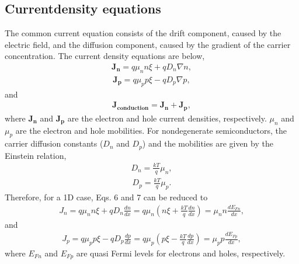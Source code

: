 \documentclass[a4paper,10pt,english]{sphinxmanual}
\begin{document}
\subsection{Current\sphinxhyphen{}density equations}
\label{\detokenize{Basic_equation:current-density-equations}}
\sphinxAtStartPar
The common current equation consists of the drift component, caused by the electric field, and the diffusion component, caused by the gradient of the carrier concentration.
The current density equations are below,
\begin{equation*}
\begin{split}\mathbf{J_n} = q\mu_nn\xi + qD_n\nabla n,\tag{6}\end{split}
\end{equation*}\begin{equation*}
\begin{split}\mathbf{J_p} = q\mu_pp\xi - qD_p\nabla p,\tag{7}\end{split}
\end{equation*}
\sphinxAtStartPar
and
\begin{equation*}
\begin{split}\mathbf{J_{conduction}} = \mathbf{J_n} + \mathbf{J_p},\tag{8}\end{split}
\end{equation*}
\sphinxAtStartPar
where \(\mathbf{J_n}\) and \(\mathbf{J_p}\) are the electron and hole current densities, respectively.
\(\mu_n\) and \(\mu_ p\) are the electron and hole mobilities.
For nondegenerate semiconductors, the carrier diffusion constants (\(D_n\) and \(D_p\)) and the mobilities are given by the Einstein relation,
\begin{equation*}
\begin{split}D_n = \frac{kT}{q}\mu_n,\tag{9}\end{split}
\end{equation*}\begin{equation*}
\begin{split}D_p = \frac{kT}{q}\mu_p.\tag{10}\end{split}
\end{equation*}
\sphinxAtStartPar
Therefore, for a 1D case, Eqs. 6 and 7 can be reduced to
\begin{equation*}
\begin{split}J_n = q\mu_nn\xi + qD_n\frac{dn}{dx} = q\mu_n\left(n\xi + \frac{kT}{q}\frac{dn}{dx}\right) = \mu_nn\frac{dE_{Fn}}{dx},\tag{11}\end{split}
\end{equation*}
\sphinxAtStartPar
and
\begin{equation*}
\begin{split}J_p = q\mu_pp\xi - qD_p\frac{dp}{dx} = q\mu_p\left(p\xi - \frac{kT}{q}\frac{dp}{dx}\right) = \mu_pp\frac{dE_{Fp}}{dx},\tag{12}\end{split}
\end{equation*}
\sphinxAtStartPar
where \(E_{Fn}\) and \(E_{Fp}\) are quasi Fermi levels for electrons and holes, respectively.
\end{document}
